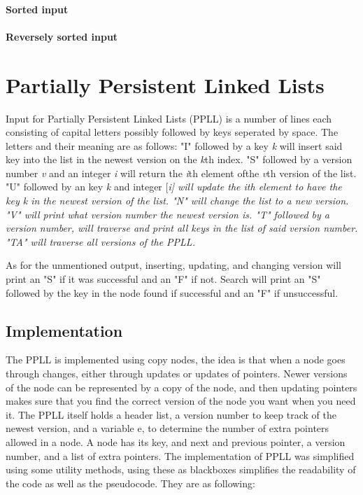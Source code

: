 \documentclass[12pt, a4paper]{article}
\begin{document}
\paragraph{Sorted input}

\paragraph{Reversely sorted input}




\section*{Partially Persistent Linked Lists}
Input for Partially Persistent Linked Lists (PPLL) is a number of lines each
consisting of capital letters possibly followed by keys seperated by space.
The letters and their meaning are as follows: 
"I" followed by a key {\it k} will insert said key into the list in the 
newest version on the {\it k}th index.
"S" followed by a version number {\it v} and an integer {\it i} 
will return the {\it i}th element ofthe {\it v}th version of the list.
"U" followed by an key {\it k} and integer [\it i] will update the {\it i}th
element to have the key {\it k} in the newest version of the list.
"N" will change the list to a new version.
"V" will print what version number the newest version is.
"T" followed by a version number, will traverse and print all keys in the 
list of said version number.
"TA" will traverse all versions of the PPLL.

\medskip
As for the unmentioned output, inserting, updating, and changing version 
will print an "S" if it was successful
and an "F" if not. Search will print an "S" followed 
by the key in the node found
if successful and an "F" if unsuccessful. 

\subsection*{Implementation}
The PPLL is implemented using copy nodes, the idea is that when a node goes 
through changes, either through updates or updates of pointers. Newer versions 
of the node can be represented by a copy of the node, and then updating pointers
makes sure that you find the correct version of the node you want when you need it.
The PPLL itself holds a header list, a version number to keep track of the newest version,
and a variable e, to determine the number of extra pointers allowed in a node.
A node has its key, and next and previous pointer, a version number, and a list of
extra pointers.
The implementation of PPLL was simplified using some utility methods, 
using these as blackboxes simplifies the readability of the code as well as the
pseudocode. They are as following:
\end{document}
